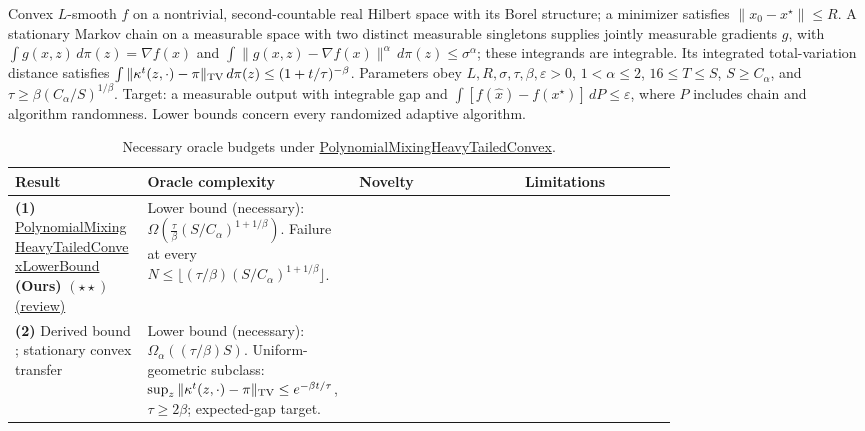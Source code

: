 \begin{table}[tp]
\centering
\caption{Necessary oracle budgets under \href{https://github.com/k3nfalt/longtails/blob/main/LongTails/Setups/PolynomialMixingHeavyTailedConvex.lean}{PolynomialMixingHeavyTailedConvex}.}\label{tab:PolynomialMixingHeavyTailedConvex}
\parbox{\linewidth}{\footnotesize Convex $L$-smooth $f$ on a nontrivial, second-countable real Hilbert space with its Borel structure; a minimizer satisfies $\|x_0-x^\star\|\le R$. A stationary Markov chain on a measurable space with two distinct measurable singletons supplies jointly measurable gradients $g$, with $\int g(x,z)\,d\pi(z)=\nabla f(x)$ and $\int\|g(x,z)-\nabla f(x)\|^\alpha\,d\pi(z)\le\sigma^\alpha$; these integrands are integrable. Its integrated total-variation distance satisfies $\int\|\kappa^t(z,\cdot)-\pi\|_{\rm TV}\,d\pi(z)\le(1+t/\tau)^{-\beta}$. Parameters obey $L,R,\sigma,\tau,\beta,\varepsilon>0$, $1<\alpha\le2$, $16\le T\le S$, $S\ge C_\alpha$, and $\tau\ge\beta(C_\alpha/S)^{1/\beta}$. Target: a measurable output with integrable gap and $\int[f(\widehat x)-f(x^\star)]\,dP\le\varepsilon$, where $P$ includes chain and algorithm randomness. Lower bounds concern every randomized adaptive algorithm.}\par\smallskip
\begin{threeparttable}
\footnotesize
\setlength{\tabcolsep}{4pt}\renewcommand{\arraystretch}{1.25}
\begin{tabularx}{\linewidth}{@{}>{\raggedright\arraybackslash}p{0.20\linewidth}>{\raggedright\arraybackslash}p{0.32\linewidth}>{\raggedright\arraybackslash}p{0.25\linewidth}>{\raggedright\arraybackslash}X@{}}
\toprule
\textbf{Result} & \textbf{Oracle complexity} & \textbf{Novelty} & \textbf{Limitations} \\
\midrule
\textbf{(1)} \href{https://github.com/k3nfalt/longtails/blob/main/LongTails/Theorems/PolynomialMixingHeavyTailedConvexLowerBound.lean}{Polynomial\allowbreak Mixing\allowbreak Heavy\allowbreak Tailed\allowbreak Convex\allowbreak Lower\allowbreak Bound} \textbf{(Ours)} $(\star\star)$ \href{https://github.com/k3nfalt/longtails/blob/main/scripts/reviews/PolynomialMixingHeavyTailedConvexLowerBound.md}{(review)}
& Lower bound (necessary): $\Omega\!\left(\frac{\tau}{\beta}(S/C_\alpha)^{1+1/\beta}\right)$. Failure at every $N\le\lfloor(\tau/\beta)(S/C_\alpha)^{1+1/\beta}\rfloor$.
& & \\
\midrule[1.2pt]
\textbf{(2)} Derived bound \citep[App.~H.4]{pmhtSarkar2026v1}; stationary convex transfer
& Lower bound (necessary): $\Omega_\alpha((\tau/\beta)S)$. Uniform-geometric subclass: $\sup_z\|\kappa^t(z,\cdot)-\pi\|_{\rm TV}\le e^{-\beta t/\tau}$, $\tau\ge2\beta$; expected-gap target.

\end{tabularx}
\end{threeparttable}
\end{table}
